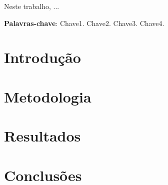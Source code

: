 \documentclass[a4paper, article, oneside, twocolumn]{abntex2}
\begin{document}
\textual
\maketitle

	\begin{resumo}
		Neste trabalho, ...
		
		\textbf{Palavras-chave}: Chave1. Chave2. Chave3. Chave4.
	\end{resumo}
	
	\section{Introdução}
	
	\section{Metodologia \label{metodologia}}
	
	\section{Resultados \label{resultados}}
	
	\section{Conclusões \label{conclusoes}}
	

\end{document}
